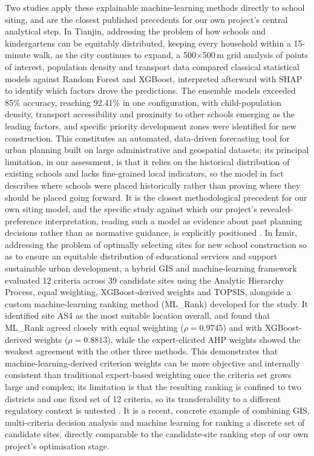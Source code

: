 \documentclass[journal]{IEEEtran}
\begin{document}
Two studies apply these explainable machine-learning methods directly to school siting, and are the closest published precedents for our own project's central analytical step. In Tianjin, addressing the problem of how schools and kindergartens can be equitably distributed, keeping every household within a 15-minute walk, as the city continues to expand, a 500$\times$500\,m grid analysis of points of interest, population density and transport data compared classical statistical models against Random Forest and XGBoost, interpreted afterward with SHAP to identify which factors drove the predictions. The ensemble models exceeded 85\% accuracy, reaching 92.41\% in one configuration, with child-population density, transport accessibility and proximity to other schools emerging as the leading factors, and specific priority development zones were identified for new construction. This constitutes an automated, data-driven forecasting tool for urban planning built on large administrative and geospatial datasets; its principal limitation, in our assessment, is that it relies on the historical distribution of existing schools and lacks fine-grained local indicators, so the model in fact describes where schools were placed historically rather than proving where they should be placed going forward. It is the closest methodological precedent for our own siting model, and the specific study against which our project's revealed-preference interpretation, reading such a model as evidence about past planning decisions rather than as normative guidance, is explicitly positioned \cite{sun2025tianjin}. In \.{I}zmir, addressing the problem of optimally selecting sites for new school construction so as to ensure an equitable distribution of educational services and support sustainable urban development, a hybrid GIS and machine-learning framework evaluated 12 criteria across 39 candidate sites using the Analytic Hierarchy Process, equal weighting, XGBoost-derived weights and TOPSIS, alongside a custom machine-learning ranking method (ML\_Rank) developed for the study. It identified site AS4 as the most suitable location overall, and found that ML\_Rank agreed closely with equal weighting ($\rho = 0.9745$) and with XGBoost-derived weights ($\rho = 0.8813$), while the expert-elicited AHP weights showed the weakest agreement with the other three methods. This demonstrates that machine-learning-derived criterion weights can be more objective and internally consistent than traditional expert-based weighting once the criteria set grows large and complex; its limitation is that the resulting ranking is confined to two districts and one fixed set of 12 criteria, so its transferability to a different regulatory context is untested \cite{basegmez2025izmir}. It is a recent, concrete example of combining GIS, multi-criteria decision analysis and machine learning for ranking a discrete set of candidate sites, directly comparable to the candidate-site ranking step of our own project's optimisation stage.
\end{document}
